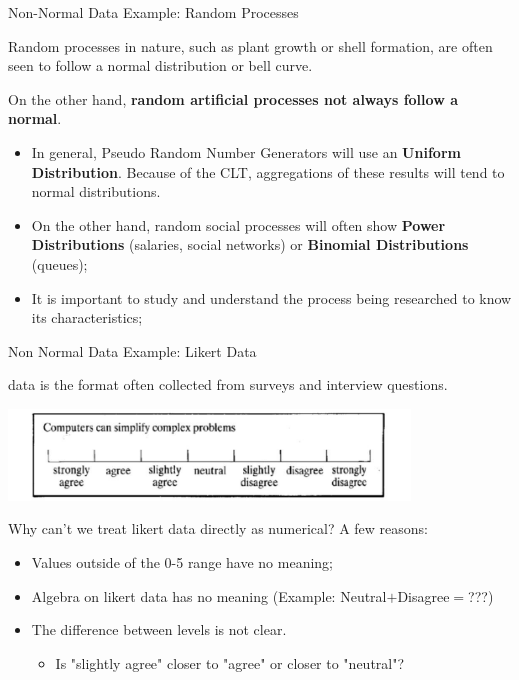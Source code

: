 \begin{frame}{Non-Normal Data Example: Random Processes}

  Random processes in nature, such as plant growth or shell formation, are often seen to follow a normal distribution or bell curve.\bigskip

  On the other hand, {\bf random artificial processes not always follow a normal}.\bigskip

  \begin{itemize}
    \item In general, Pseudo Random Number Generators will use an {\bf Uniform Distribution}. Because of the CLT, aggregations of these results will tend to normal distributions.\medskip

    \item On the other hand, random social processes will often show {\bf Power Distributions} (salaries, social networks) or {\bf Binomial Distributions} (queues);\medskip

    \item It is important to study and understand the process being researched to know its characteristics;
  \end{itemize}
\end{frame}

\begin{frame}{Non Normal Data Example: Likert Data}

 data is the format often collected from surveys and interview questions.\medskip

\begin{center}
  \includegraphics[width=0.8\textwidth]{../img/likert_scale}
\end{center}

Why can't we treat likert data directly as numerical? A few reasons:
\begin{itemize}
  \item Values outside of the 0-5 range have no meaning;
  \item Algebra on likert data has no meaning (Example: Neutral$+$Disagree$=$???)
  \item The difference between levels is not clear.
  \begin{itemize}
    \item Is "slightly agree" closer to "agree" or closer to "neutral"?
  \end{itemize}
\end{itemize}
\end{frame}

